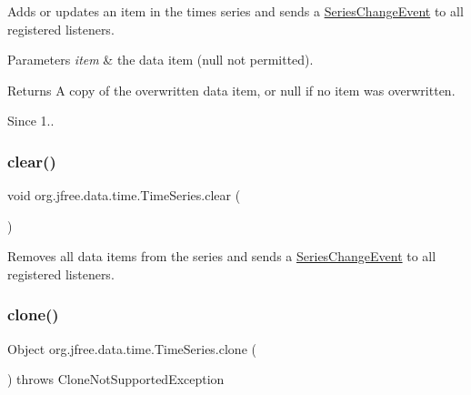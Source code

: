 Adds or updates an item in the times series and sends a \mbox{\hyperlink{}{Series\+Change\+Event}} to all registered listeners.


\begin{DoxyParams}{Parameters}
{\em item} & the data item ({\ttfamily null} not permitted).\\
\hline
\end{DoxyParams}
\begin{DoxyReturn}{Returns}
A copy of the overwritten data item, or {\ttfamily null} if no item was overwritten.
\end{DoxyReturn}
\begin{DoxySince}{Since}
1.. 
\end{DoxySince}
\mbox{\label{classorg_1_1jfree_1_1data_1_1time_1_1_time_series_a195539c7622ac01fb882d1e8b2485b5f}} 
\subsubsection{\texorpdfstring{clear()}{clear()}}
{\footnotesize\ttfamily void org.\+jfree.\+data.\+time.\+Time\+Series.\+clear (\begin{DoxyParamCaption}{ }\end{DoxyParamCaption})}

Removes all data items from the series and sends a \mbox{\hyperlink{}{Series\+Change\+Event}} to all registered listeners. \mbox{\label{classorg_1_1jfree_1_1data_1_1time_1_1_time_series_a1c681636596d01d246ff4716019459c2}} 
\subsubsection{\texorpdfstring{clone()}{clone()}}
{\footnotesize\ttfamily Object org.\+jfree.\+data.\+time.\+Time\+Series.\+clone (\begin{DoxyParamCaption}{ }\end{DoxyParamCaption}) throws Clone\+Not\+Supported\+Exception}

